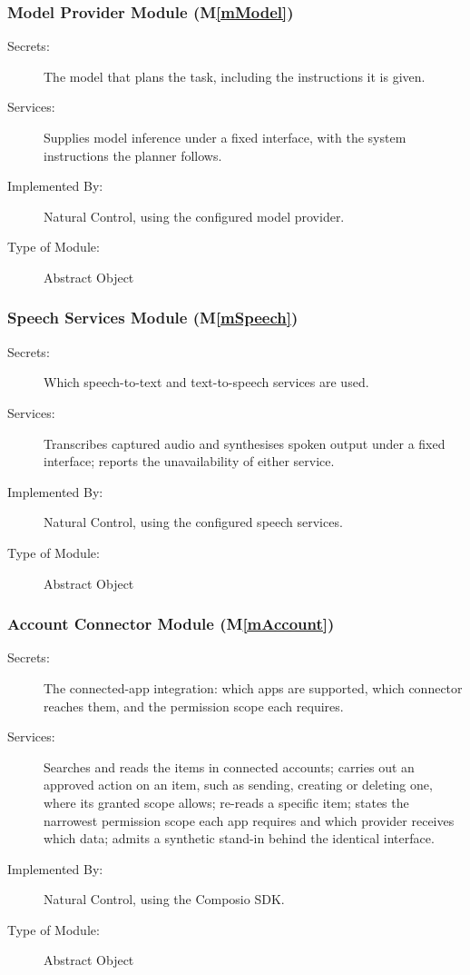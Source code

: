 \documentclass[12pt, titlepage]{article}
\newcommand{\progname}{Natural Control}
\newcommand{\mref}[1]{M\ref{#1}}
\begin{document}
\subsubsection{Model Provider Module (\mref{mModel})}
\begin{description}
\item[Secrets:] The model that plans the task, including the instructions it
is given.
\item[Services:] Supplies model inference under a fixed interface, with the
system instructions the planner follows.
\item[Implemented By:] \progname{}, using the configured model provider.
\item[Type of Module:] Abstract Object
\end{description}

\subsubsection{Speech Services Module (\mref{mSpeech})}
\begin{description}
\item[Secrets:] Which speech-to-text and text-to-speech services are used.
\item[Services:] Transcribes captured audio and synthesises spoken output under a
fixed interface; reports the unavailability of either service.
\item[Implemented By:] \progname{}, using the configured speech services.
\item[Type of Module:] Abstract Object
\end{description}

\subsubsection{Account Connector Module (\mref{mAccount})}
\begin{description}
\item[Secrets:] The connected-app integration: which apps are supported,
which connector reaches them, and the permission scope each requires.
\item[Services:] Searches and reads the items in connected accounts; carries
out an approved action on an item, such as sending, creating or deleting one,
where its granted scope allows; re-reads a specific item; states the narrowest
permission scope each app requires and which provider receives which data;
admits a synthetic stand-in behind the identical interface.
\item[Implemented By:] \progname{}, using the Composio SDK.
\item[Type of Module:] Abstract Object
\end{description}
\end{document}
